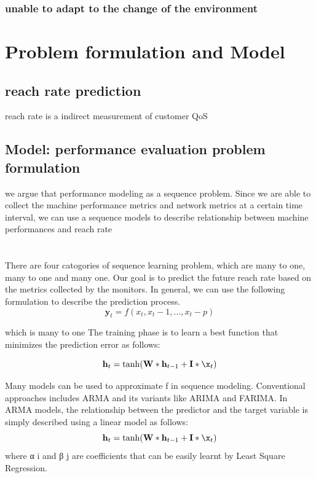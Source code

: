 \documentclass[review]{elsarticle}
\newcommand{\dabiaolv}{reach rate }
\begin{document}
\subsubsection{unable to adapt to the change of the environment}


\section{Problem formulation and Model}
\subsection{\dabiaolv prediction}
\dabiaolv is a indirect measurement of customer QoS
\subsection{Model: performance evaluation problem formulation}
we argue that performance modeling as a sequence problem. 
Since we are able to collect the machine performance metrics and network metrics at a certain time interval, we can use a sequence models to describe relationship between machine performances and \dabiaolv
\section{}
There are four catogories of sequence learning problem, which are many to one, many to one and many one. 
Our goal is to predict the future \dabiaolv based on the metrics collected by the monitors. In general, we can use the following formulation to describe the prediction process.
\begin{equation}
	\mathbf y_t = f(x_t,x_t-1,...,x_t-p)
\end{equation}

which is many to one    
The training phase is to learn a best function that minimizes
the prediction error as follows:

\begin{equation}
	\mathbf h_t = \tanh(\mathbf W * \mathbf h_{t-1} + \mathbf I * \x_t)
\end{equation}

Many models can be used to approximate f in sequence modeling. Conventional approaches includes ARMA and its variants like ARIMA
and FARIMA. In ARMA models, the relationship between the
predictor and the target variable is simply described using a
linear model as follows:
\begin{equation}
	\mathbf h_t = \tanh(\mathbf W * \mathbf h_{t-1} + \mathbf I * \x_t)
\end{equation}
where α i and β j are coefficients that can be easily learnt by Least Square Regression.
\end{document}

